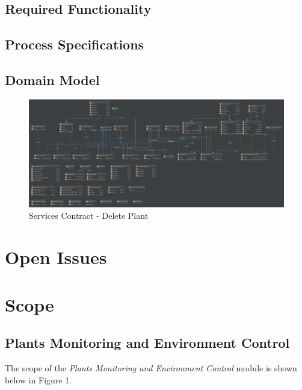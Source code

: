 \documentclass{article}
\begin{document}
	\subsection{Required Functionality}
	\subsection{Process Specifications}
	
	
	\begin{landscape}
		\subsection{Domain Model}
		\begin{figure}[H]
			\includegraphics[width=\linewidth]{../images/aworldofplants_domain.png}
			\caption{Services Contract - Delete Plant}
		\end{figure}
	\end{landscape}

\newpage
\section{Open Issues}

\section{Scope}
	\subsection{Plants Monitoring and Environment Control}
		The scope of the \emph{Plants Monitoring and Environment Control} module is shown below in Figure 1.
		
\end{document}
